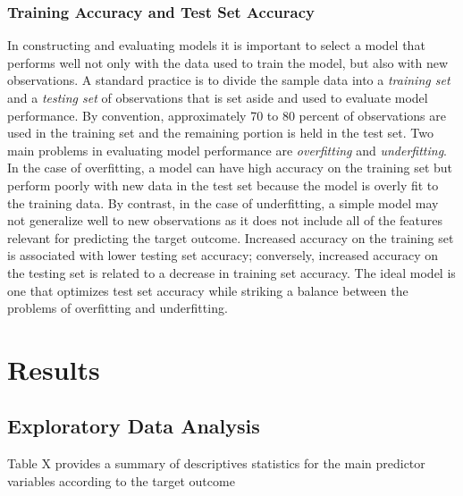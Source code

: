 \documentclass[sigconf]{acmart}
\begin{document}

\subsubsection{Training Accuracy and Test Set Accuracy}

In constructing and evaluating models it is important to select a model 
that performs well not only with the data used to train the model, but 
also with new observations. A standard practice is to divide the sample 
data into a \emph{training set} and a \emph{testing set} of observations 
that is set aside and used to evaluate model performance. By convention, 
approximately 70 to 80 percent of observations are used in the training set 
and the remaining portion is held in the test set. Two main problems in 
evaluating model performance are \emph{overfitting} and \emph{underfitting}. 
In the case of overfitting, a model can have high accuracy on the training 
set but perform poorly with new data in the test set because the model is 
overly fit to the training data. By contrast, in the case of underfitting, 
a simple model may not generalize well to new observations as it does not 
include all of the features relevant for predicting the target outcome. 
Increased accuracy on the training set is associated with lower testing set 
accuracy; conversely, increased accuracy on the testing set is related to a 
decrease in training set accuracy. The ideal model is one that optimizes test 
set accuracy while striking a balance between the problems of overfitting 
and underfitting. 






 
\section{Results}

\subsection{Exploratory Data Analysis}

Table X provides a summary of descriptives statistics for the main
predictor variables according to the target outcome 
\end{document}
